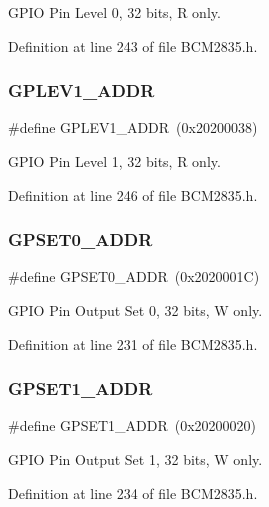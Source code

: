 G\+P\+IO Pin Level 0, 32 bits, R only. 



Definition at line 243 of file B\+C\+M2835.\+h.

\mbox{\label{group__GPIO_gafd408bfb4a12c49e73389a9004c532a0}} 
\subsubsection{\texorpdfstring{G\+P\+L\+E\+V1\+\_\+\+A\+D\+DR}{GPLEV1\_ADDR}}
{\footnotesize\ttfamily \#define G\+P\+L\+E\+V1\+\_\+\+A\+D\+DR~(0x20200038)}



G\+P\+IO Pin Level 1, 32 bits, R only. 



Definition at line 246 of file B\+C\+M2835.\+h.

\mbox{\label{group__GPIO_ga226a4472dd8e6b8cbb47961287241ea1}} 
\subsubsection{\texorpdfstring{G\+P\+S\+E\+T0\+\_\+\+A\+D\+DR}{GPSET0\_ADDR}}
{\footnotesize\ttfamily \#define G\+P\+S\+E\+T0\+\_\+\+A\+D\+DR~(0x2020001\+C)}



G\+P\+IO Pin Output Set 0, 32 bits, W only. 



Definition at line 231 of file B\+C\+M2835.\+h.

\mbox{\label{group__GPIO_gaaece09379857ff0604275597943a0cd4}} 
\subsubsection{\texorpdfstring{G\+P\+S\+E\+T1\+\_\+\+A\+D\+DR}{GPSET1\_ADDR}}
{\footnotesize\ttfamily \#define G\+P\+S\+E\+T1\+\_\+\+A\+D\+DR~(0x20200020)}



G\+P\+IO Pin Output Set 1, 32 bits, W only. 



Definition at line 234 of file B\+C\+M2835.\+h.

